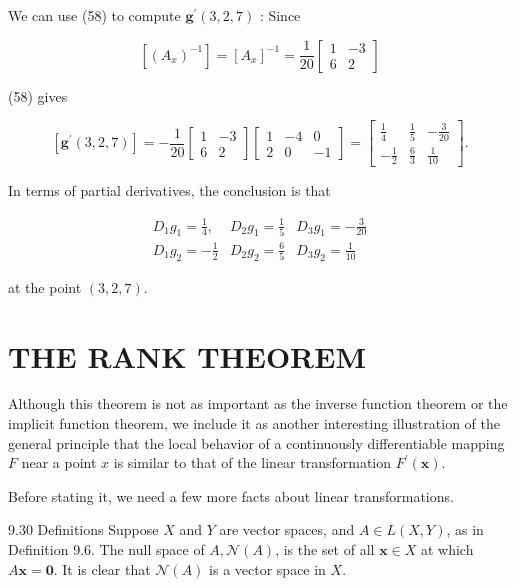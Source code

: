 \documentclass[10pt]{article}
\begin{document}
We can use (58) to compute $\mathbf{g}^{\prime}(3,2,7)$ : Since

$$
\left[\left(A_{x}\right)^{-1}\right]=\left[A_{x}\right]^{-1}=\frac{1}{20}\left[\begin{array}{rr}
1 & -3 \\
6 & 2
\end{array}\right]
$$

(58) gives

$$
\left[\mathbf{g}^{\prime}(3,2,7)\right]=-\frac{1}{20}\left[\begin{array}{rr}
1 & -3 \\
6 & 2
\end{array}\right]\left[\begin{array}{rrr}
1 & -4 & 0 \\
2 & 0 & -1
\end{array}\right]=\left[\begin{array}{rrr}
\frac{1}{4} & \frac{1}{5} & -\frac{3}{20} \\
-\frac{1}{2} & \frac{6}{3} & \frac{1}{10}
\end{array}\right] .
$$

In terms of partial derivatives, the conclusion is that

$$
\begin{array}{lll}
D_{1} g_{1}=\frac{1}{4}, & D_{2} g_{1}=\frac{1}{5} & D_{3} g_{1}=-\frac{3}{20} \\
D_{1} g_{2}=-\frac{1}{2} & D_{2} g_{2}=\frac{6}{5} & D_{3} g_{2}=\frac{1}{10}
\end{array}
$$

at the point $(3,2,7)$.

\section{THE RANK THEOREM}
Although this theorem is not as important as the inverse function theorem or the implicit function theorem, we include it as another interesting illustration of the general principle that the local behavior of a continuously differentiable mapping $F$ near a point $x$ is similar to that of the linear transformation $F^{\prime}(\mathbf{x})$.

Before stating it, we need a few more facts about linear transformations.

9.30 Definitions Suppose $X$ and $Y$ are vector spaces, and $A \in L(X, Y)$, as in Definition 9.6. The null space of $A, \mathscr{N}(A)$, is the set of all $\mathbf{x} \in X$ at which $A \mathbf{x}=\mathbf{0}$. It is clear that $\mathscr{N}(A)$ is a vector space in $X$.
\end{document}
